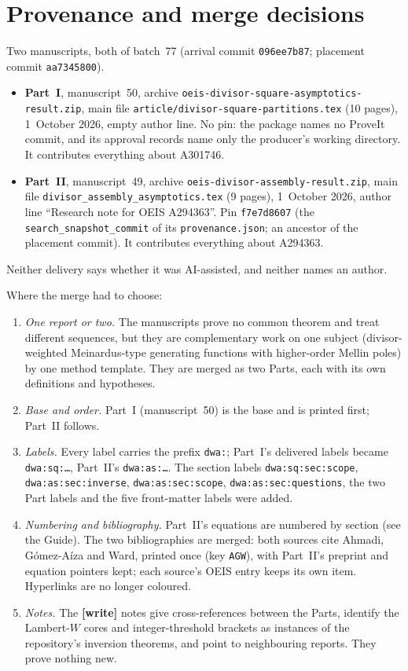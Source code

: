 \documentclass[11pt,letterpaper]{article}
\newcommand{\file}[1]{\nolinkurl{#1}}
\numberwithin{equation}{section}
\theoremstyle{remark}
\begin{document}
\section*{Provenance and merge decisions}\label{dwa:sec:provenance}
Two manuscripts, both of batch~77 (arrival commit \texttt{096ee7b87}; placement commit \texttt{aa7345800}).
\begin{itemize}
\item \textbf{Part~I}, manuscript~50, archive \file{oeis-divisor-square-asymptotics-result.zip}, main file \file{article/divisor-square-partitions.tex} (10 pages), 1~October 2026, empty author line. No pin: the package names no ProveIt commit, and its approval records name only the producer's working directory. It contributes everything about A301746.
\item \textbf{Part~II}, manuscript~49, archive \file{oeis-divisor-assembly-result.zip}, main file \file{divisor_assembly_asymptotics.tex} (9 pages), 1~October 2026, author line ``Research note for OEIS A294363''. Pin \texttt{f7e7d8607} (the \texttt{search\_snapshot\_commit} of its \file{provenance.json}; an ancestor of the placement commit). It contributes everything about A294363.
\end{itemize}
Neither delivery says whether it was AI-assisted, and neither names an author.

Where the merge had to choose:
\begin{enumerate}
\item \emph{One report or two.} The manuscripts prove no common theorem and treat different sequences, but they are complementary work on one subject (divisor-weighted Meinardus-type generating functions with higher-order Mellin poles) by one method template. They are merged as two Parts, each with its own definitions and hypotheses.
\item \emph{Base and order.} Part~I (manuscript~50) is the base and is printed first; Part~II follows.
\item \emph{Labels.} Every label carries the prefix \texttt{dwa:}; Part~I's delivered labels became \texttt{dwa:sq:\ldots}, Part~II's \texttt{dwa:as:\ldots}. The section labels \texttt{dwa:sq:sec:scope}, \texttt{dwa:as:sec:inverse}, \texttt{dwa:as:sec:scope}, \texttt{dwa:as:sec:questions}, the two Part labels and the five front-matter labels were added.
\item \emph{Numbering and bibliography.} Part~II's equations are numbered by section (see the Guide). The two bibliographies are merged: both sources cite Ahmadi, G\'omez-A\'iza and Ward, printed once (key \texttt{AGW}), with Part~II's preprint and equation pointers kept; each source's OEIS entry keeps its own item. Hyperlinks are no longer coloured.
\item \emph{Notes.} The \textbf{[write]} notes give cross-references between the Parts, identify the Lambert-$W$ cores and integer-threshold brackets as instances of the repository's inversion theorems, and point to neighbouring reports. They prove nothing new.
\end{enumerate}
\end{document}
